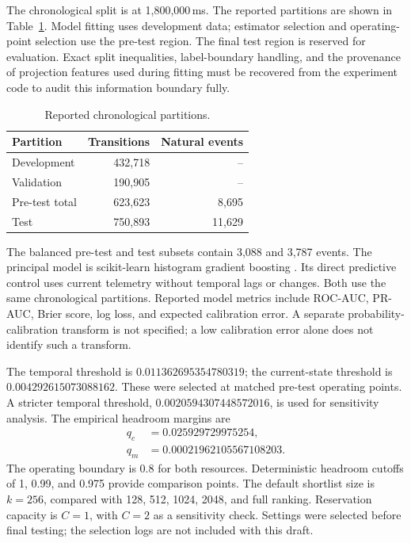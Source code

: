 The chronological split is at 1,800,000\,ms. The reported partitions are
shown in Table~\ref{tab:partitions}. Model fitting uses development data;
estimator selection and operating-point selection use the pre-test region.
The final test region is reserved for evaluation. Exact split inequalities,
label-boundary handling, and the provenance of projection features used
during fitting must be recovered from the experiment code to audit this
information boundary fully.

\begin{table}[t]
\centering
\caption{Reported chronological partitions.}\label{tab:partitions}
\begin{tabular}{lrr}
\toprule
Partition & Transitions & Natural events\\
\midrule
Development &432,718&--\\
Validation &190,905&--\\
Pre-test total &623,623&8,695\\
Test &750,893&11,629\\
\bottomrule
\end{tabular}
\end{table}

The balanced pre-test and test subsets contain 3,088 and 3,787 events.
The principal model is scikit-learn histogram gradient boosting
\citep{pedregosa2011sklearn}. Its direct predictive control uses current
telemetry without temporal lags or changes. Both use the same chronological
partitions. Reported model metrics include ROC-AUC, PR-AUC, Brier score,
log loss, and expected calibration error. A separate probability-calibration
transform is not specified; a low calibration error alone does not identify
such a transform.

The temporal threshold is $0.011362695354780319$; the current-state
threshold is $0.004292615073088162$. These were selected at matched
pre-test operating points. A stricter temporal threshold,
$0.0020594307448572016$, is used for sensitivity analysis. The empirical
headroom margins are
\begin{align}
q_c&=0.025929729975254,\\
q_m&=0.00021962105567108203.
\end{align}
The operating boundary is 0.8 for both resources. Deterministic headroom
cutoffs of 1, 0.99, and 0.975 provide comparison points. The default
shortlist size is $k=256$, compared with 128, 512, 1024, 2048, and full
ranking. Reservation capacity is $C=1$, with $C=2$ as a sensitivity check.
Settings were selected before final testing; the selection logs are not
included with this draft.

